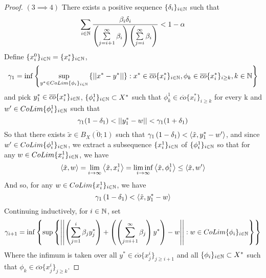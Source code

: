 \begin{lem}
    \begin{proof} $(3 \implies 4)$
        There exists a positive sequence $\{\delta_i\}_{i \in \mathbb{N}}$ such that 
        \begin{equation} 
            \sum_{i \in \mathbb{N}} \frac{\beta_i \delta_i}{\left(  \sum\limits_{j=i+1}^{\infty} \beta_i\right) \left(  \sum\limits_{j=i}^{\infty} \beta_i\right)} < 1-\alpha
        \end{equation} 
        Define $\{x_i^0\}_{i \in \mathbb{N}} = \{x_i^*\}_{i \in \mathbb{N}}$, 
        \begin{equation}
            \gamma_1 = \inf\left\{ \sup\limits_{y^* \in CoLim\{\phi_i\}_{ i\in \mathbb{N}}} \left\{ \left|\left| x^*-y^* \right|\right|\right\} : x^* \in \overline{co}\{x_i^*\}_{i \in \mathbb{N}}, \phi_k \in \overline{co}\{x_i^*\}_{i \geq k}, k \in \mathbb{N} \right\}
        \end{equation}
        and pick $y_1^* \in \overline{co}\{x_i^*\}_{i \in \mathbb{N}}$, $\{\phi_i^1\}_{i \in \mathbb{N}} \subset X^*$ such that $\phi_k^1 \in \overline{co}\{x_i^*\}_{i \geq k}$ for every k and $w'
        \in CoLim\{\phi_i^1\}_{i \in \mathbb{N}}$ such that 
        \begin{equation} 
            \gamma_1(1-\delta_1) < \left|\left| y_1^*-w \right|\right| < \gamma_1(1+\delta_1)
        \end{equation}
        So that there exists $\tilde{x} \in \overline{B_X(0;1)}$ such that $\gamma_1 \left( 1-\delta_1\right) < \left\langle \tilde{x},y_1^*-w' \right\rangle$, and since $w' \in CoLim\{\phi_i^1\}_{i \in \mathbb{N}}$, we extract a subsequence $\{x_i^1\}_{i \in \mathbb{N}}$ of $\{\phi_i^1\}_{i \in \mathbb{N}}$  so that for any $w \in CoLim\{x_i^1\}_{i \in \mathbb{N}}$, we have 
        \begin{equation}
            \left\langle \tilde{x},w \right\rangle = \lim\limits_{i \to \infty} \left\langle \tilde{x},x_i^1 \right\rangle = \liminf\limits_{i \to \infty} \left\langle \tilde{x},\phi_i^1 \right\rangle \leq \left\langle \tilde{x},w' \right\rangle
        \end{equation}
        And so, for any $w \in CoLim\{x_i^1\}_{i \in \mathbb{N}}$, we have
        \begin{equation} 
            \gamma_1  \left( 1-\delta_1\right) < \left\langle \tilde{x},y_1^*-w \right\rangle
        \end{equation}
        Continuing inductively, for $i \in \mathbb{N}$, set 
        \begin{equation}
            \gamma_{i+1}= \inf \left\{ \sup \left\{ \left|\left| \left( \sum_{j=1}^{i} \beta_j y_j^*\right) + \left( \left( \sum_{j=i+1}^{\infty}\beta_j \right)y^*\right)-w \right|\right|: w \in CoLim\{\phi_i\}_{i \in\mathbb{N}}\right\}\right\}
        \end{equation}
        Where the infimum is taken over all $y^* \in \overline{co}\{x_j^{i}\}_{j \geq i+1}$ and all $\{\phi_i\}_{i \in \mathbb{N}} \subset X^*$ such that $\phi_k \in \overline{co} \{x_j^i\}_{j \geq k}$. 

\end{proof}
\end{lem}
